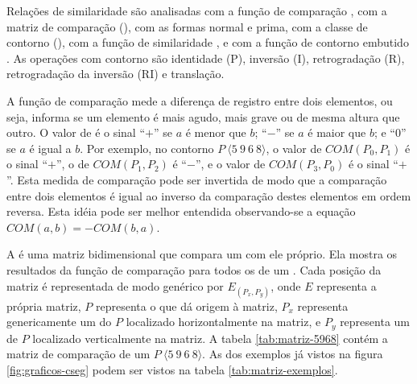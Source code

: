 Relações de similaridade \cite{marvin.ea87:relating} são analisadas
com a função de comparação , com a matriz de comparação
(), com as formas normal e prima, com a classe de
contorno (), com a função de similaridade , e
com a função de contorno embutido . As operações com
contorno são identidade (P), inversão (I), retrogradação (R),
retrogradação da inversão (RI) e translação.

A função de comparação  mede a diferença de registro entre
dois elementos, ou seja, informa se um elemento é mais agudo, mais
grave ou de mesma altura que outro. O valor de  é o sinal
``$+$'' se $a$ é menor que $b$; ``$-$'' se $a$ é maior que $b$; e
``$0$'' se $a$ é igual a $b$. Por exemplo, no contorno
$P\:\langle5\:9\:6\:8\rangle$, o valor de $COM(P_0,P_1)$ é o sinal
``$+$'', o de $COM(P_1,P_2)$ é ``$-$'', e o valor de $COM(P_3,P_0)$ é
o sinal ``$+$''. Esta medida de comparação pode ser invertida de modo
que a comparação entre dois elementos é igual ao inverso da comparação
destes elementos em ordem reversa. Esta idéia pode ser melhor
entendida observando-se a equação $COM(a,b)=-COM(b,a)$.

A  é uma matriz bidimensional que compara um
 com ele próprio. Ela mostra os resultados da função de
comparação  para todos os  de um
. Cada posição da matriz é representada de modo genérico
por $E_(P_x,P_y)$, onde $E$ representa a própria matriz, $P$
representa o  que dá origem à matriz, $P_x$ representa
genericamente um  do  $P$ localizado
horizontalmente na matriz, e $P_y$ representa um  de
$P$ localizado verticalmente na matriz. A tabela \ref{tab:matriz-5968}
contém a matriz de comparação de um 
$P\:\langle5\:9\:6\:8\rangle$. As  dos exemplos já
vistos na figura \ref{fig:graficos-cseg} podem ser vistos na tabela
\ref{tab:matriz-exemplos}.

